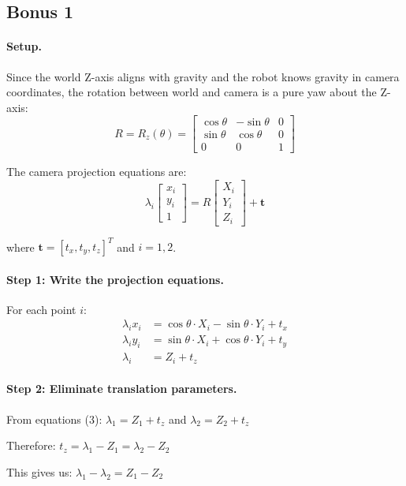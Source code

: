\documentclass[12pt]{article}
\begin{document}
\subsection*{Bonus 1}

\paragraph{Setup.} Since the world Z-axis aligns with gravity and the robot knows gravity in camera coordinates, the rotation between world and camera is a pure yaw about the Z-axis:
\[
R = R_z(\theta) = \begin{bmatrix}
\cos\theta & -\sin\theta & 0 \\
\sin\theta & \cos\theta & 0 \\
0 & 0 & 1
\end{bmatrix}
\]

The camera projection equations are:
\[
\lambda_i \begin{bmatrix} x_i \\ y_i \\ 1 \end{bmatrix} = R \begin{bmatrix} X_i \\ Y_i \\ Z_i \end{bmatrix} + \mathbf{t}
\]

where $\mathbf{t} = [t_x, t_y, t_z]^T$ and $i = 1, 2$.

\paragraph{Step 1: Write the projection equations.}
For each point $i$:
\begin{align}
\lambda_i x_i &= \cos\theta \cdot X_i - \sin\theta \cdot Y_i + t_x \\
\lambda_i y_i &= \sin\theta \cdot X_i + \cos\theta \cdot Y_i + t_y \\
\lambda_i &= Z_i + t_z
\end{align}

\paragraph{Step 2: Eliminate translation parameters.}
From equations (3): $\lambda_1 = Z_1 + t_z$ and $\lambda_2 = Z_2 + t_z$

Therefore: $t_z = \lambda_1 - Z_1 = \lambda_2 - Z_2$

This gives us: $\lambda_1 - \lambda_2 = Z_1 - Z_2$
\end{document}

